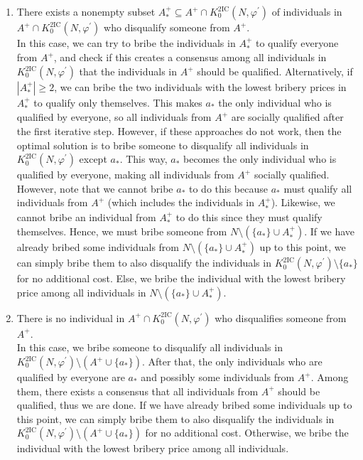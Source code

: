 \documentclass[
    12pt,               %
    a4paper,            %
    bibtotoc,           %
    pointlessnumbers,   %
    ngerman,            %
    titlepage,          %
    leqno,              %
    ]{scrarticle}       %
\begin{document}
\begin{Proof}
\begin{enumerate}[
    leftmargin=*,
    label={\textit{Case \ref*{thm:2ic_cgb_p}.\arabic*}:}
]
\item
There exists a nonempty subset $A^+_\ast \subseteq A^+ \cap K^{\text{2IC}}_0(N, \varphi^\prime)$ of individuals in $A^+ \cap K^{\text{2IC}}_0(N, \varphi^\prime)$ who disqualify someone from $A^+$. \\
In this case, we can try to bribe the individuals in $A^+_\ast$ to qualify everyone from $A^+$, and check if this creates a consensus among all individuals in $K^{\text{2IC}}_0(N, \varphi^\prime)$ that the individuals in $A^+$ should be qualified. Alternatively, if $|A^+_\ast| \geq 2$, we can bribe the two individuals with the lowest bribery prices in $A^+_\ast$ to qualify only themselves. This makes $a_\ast$ the only individual who is qualified by everyone, so all individuals from $A^+$ are socially qualified after the first iterative step. However, if these approaches do not work, then the optimal solution is to bribe someone to disqualify all individuals in $K^{\text{2IC}}_0(N, \varphi^\prime)$ except $a_\ast$. This way, $a_\ast$ becomes the only individual who is qualified by everyone, making all individuals from $A^+$ socially qualified. However, note that we cannot bribe $a_\ast$ to do this because $a_\ast$ must qualify all individuals from $A^+$ (which includes the individuals in $A^+_\ast$). Likewise, we cannot bribe an individual from $A^+_\ast$ to do this since they must qualify themselves. Hence, we must bribe someone from $N \setminus (\{a_\ast\} \cup A^+_\ast)$. If we have already bribed some individuals from $N \setminus (\{a_\ast\} \cup A^+_\ast)$ up to this point, we can simply bribe them to also disqualify the individuals in $K^{\text{2IC}}_0(N, \varphi^\prime) \setminus \{a_\ast\}$ for no additional cost. Else, we bribe the individual with the lowest bribery price among all individuals in $N \setminus (\{a_\ast\} \cup A^+_\ast)$.

\item
There is no individual in $A^+ \cap K^{\text{2IC}}_0(N, \varphi^\prime)$ who disqualifies someone from $A^+$. \\
In this case, we bribe someone to disqualify all individuals in $K^{\text{2IC}}_0(N, \varphi^\prime) \setminus (A^+ \cup \{a_\ast\})$. After that, the only individuals who are qualified by everyone are $a_\ast$ and possibly some individuals from $A^+$. Among them, there exists a consensus that all individuals from $A^+$ should be qualified, thus we are done. If we have already bribed some individuals up to this point, we can simply bribe them to also disqualify the individuals in $K^{\text{2IC}}_0(N, \varphi^\prime) \setminus (A^+ \cup \{a_\ast\})$ for no additional cost. Otherwise, we bribe the individual with the lowest bribery price among all individuals.
\end{enumerate}


\end{Proof}
\end{document}
